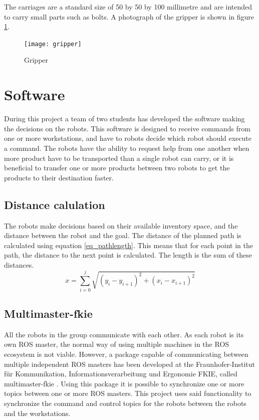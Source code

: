 \documentclass[10pt, journal]{IEEEtran}
\begin{document}
The carriages are a standard size of 50 by 50 by 100 millimetre and are intended to carry small parts such as bolts. A photograph of the gripper is shown in figure \ref{Gripper}.
\begin{figure}[htp]
\centering
\texttt{[image: gripper]}
\caption{Gripper}
\label{Gripper}
\end{figure}

\section{Software}
During this project a team of two students has developed the software making the decisions on the robots. This software is designed to receive commands from one or more workstations, and have to robots decide which robot should execute a command. The robots have the ability to request help from one another when more product have to be transported than a single robot can carry, or it is beneficial to transfer one or more products between two robots to get the products to their destination faster.

\subsection{Distance calulation}
The robots make decisions based on their available inventory space, and the distance between the robot and the goal. The distance of the planned path is calculated using equation \ref{eq_pathlength}. This means that for each point in the path, the distance to the next point is calculated. The length is the sum of these distances.
\begin{equation}
\label{eq_pathlength}
x = \sum\limits_{i=0}^j \sqrt{(y_i - y_{i+1})^2 + (x_i - x_{i+1})^2}
\end{equation}

\subsection{Multimaster-fkie}
All the robots in the group communicate with each other. As each robot is its own ROS master, the normal\cite{ROSMultipleMachines} way of using multiple machines in the ROS ecosystem is not viable. However, a package capable of communicating between multiple independent ROS masters has been developed at the Fraunhofer-Institut f{\"u}r Kommunikation, Informationsverarbeitung und Ergonomie FKIE, called multimaster-fkie \cite{Multimaster-fkie}. Using this package it is possible to synchronize one or more topics between one or more ROS masters. This project uses said functionality to synchronize the command and control topics for the robots between the robots and the workstations.
\end{document}
